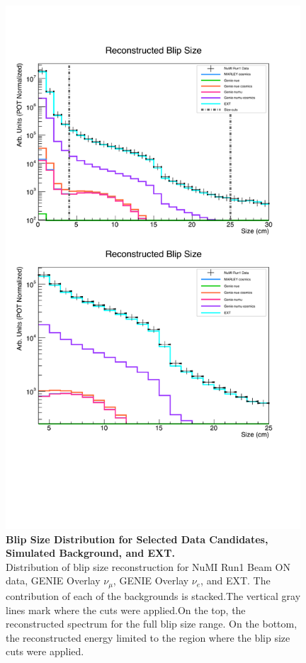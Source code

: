 \begin{figure}[h!]
    \centering
    \includegraphics[width=110mm]{Figures/blip_size_double.pdf}
    \caption[Blip Size Distribution for Selected Data Candidates, Simulated Background, and EXT.]{{\textbf{Blip Size Distribution for Selected Data Candidates, Simulated Background, and EXT.}}\\ Distribution of blip size reconstruction for NuMI Run1 Beam ON data, GENIE Overlay $\nu_{\mu}$, GENIE Overlay $\nu_{e}$, and EXT. The contribution of each of the backgrounds is stacked.The vertical gray lines mark where the cuts were applied.On the top, the reconstructed spectrum for the full blip size range. On the bottom, the reconstructed energy limited to the region where the blip size cuts were applied.}
    \label{data_mc_size}
\end{figure}

